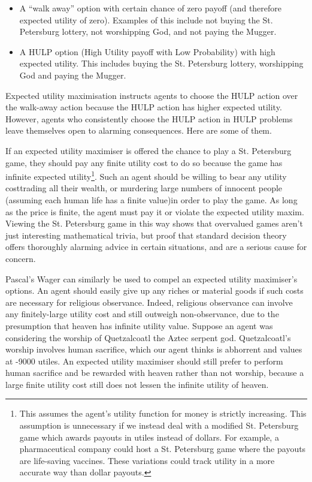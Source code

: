 \documentclass{article}
\begin{document}
\begin{itemize}
\item A ``walk away'' option with certain chance of zero payoff (and therefore expected utility of zero). Examples of this include not buying the St. Petersburg lottery, not worshipping God, and not paying the Mugger.
\item A HULP option (High Utility payoff with Low Probability) with high expected utility. This includes buying the St. Petersburg lottery, worshipping God and paying the Mugger.
\end{itemize}

Expected utility maximisation instructs agents to choose the HULP action over the walk-away action because the HULP action has higher expected utility. However, agents who consistently choose the HULP action in HULP problems leave themselves open to alarming consequences. Here are some of them.

If an expected utility maximiser is offered the chance to play a St. Petersburg game, they should pay any finite utility cost to do so because the game has infinite expected utility\footnote{This assumes the agent's utility function for money is strictly increasing. This assumption is unnecessary if we instead deal with a modified St. Petersburg game which awards payouts in utiles instead of dollars. For example, a pharmaceutical company could host a St. Petersburg game where the payouts are life-saving vaccines. These variations could track utility in a more accurate way than dollar payouts.}. Such an agent should be willing to bear any utility cost\textemdash trading all their wealth, or murdering large numbers of innocent people (assuming each human life has a finite value)\textemdash in order to play the game. As long as the price is finite, the agent must pay it or violate the expected utility maxim. Viewing the St. Petersburg game in this way shows that overvalued games aren't just interesting mathematical trivia, but proof that standard decision theory offers thoroughly alarming advice in certain situations, and are a serious cause for concern.

Pascal's Wager can similarly be used to compel an expected utility maximiser's options. An agent should easily give up any riches or material goods if such costs are necessary for religious observance. Indeed, religious observance can involve any finitely-large utility cost and still outweigh non-observance, due to the presumption that heaven has infinite utility value. Suppose an agent was considering the worship of Quetzalcoatl the Aztec serpent god. Quetzalcoatl's worship involves human sacrifice, which our agent thinks is abhorrent and values at -9000 utiles. An expected utility maximiser should still prefer to perform human sacrifice and be rewarded with heaven rather than not worship, because a large finite utility cost still does not lessen the infinite utility of heaven. 
\end{document}
